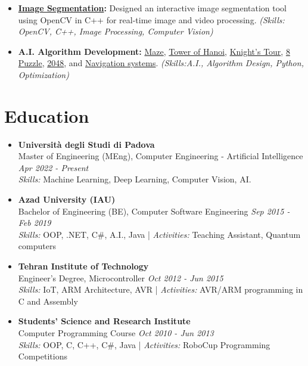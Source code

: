 \documentclass[a4paper]{article}
\begin{document}
\begin{itemize}[left=0pt]
    \item \textbf{\href{https://github.com/PooyaNasiri/image-segmenter}{Image Segmentation}:} Designed an interactive image segmentation tool using OpenCV in C++ for real-time image and video processing. \textit{(Skills: OpenCV, C++, Image Processing, Computer Vision)}

   \item \textbf{A.I. Algorithm Development:} 
\href{https://github.com/PooyaNasiri/maze}{Maze}, 
\href{https://github.com/PooyaNasiri/tower-of-hanoi}{Tower of Hanoi}, 
\href{https://github.com/PooyaNasiri/knights-tour}{Knight's Tour}, 
\href{https://github.com/PooyaNasiri/8Puzzle}{8 Puzzle}, 
\href{https://github.com/PooyaNasiri/2048}{2048}, and 
\href{https://github.com/PooyaNasiri/Navigator}{Navigation systems}. 
\textit{(Skills:A.I., Algorithm Design, Python, Optimization)}
\end{itemize}


\section*{Education}
\begin{itemize}[left=0pt]
    \item \textbf{Università degli Studi di Padova} \\
    Master of Engineering (MEng), Computer Engineering - Artificial Intelligence \hfill \textit{Apr 2022 - Present} \\
    \textit{Skills:} Machine Learning, Deep Learning, Computer Vision, AI.
    
    \item \textbf{Azad University (IAU)} \\
    Bachelor of Engineering (BE), Computer Software Engineering \hfill \textit{Sep 2015 - Feb 2019} \\
    \textit{Skills:} OOP, .NET, C\#, A.I., Java  |  \textit{Activities:} Teaching Assistant, Quantum computers

    \item \textbf{Tehran Institute of Technology} \\
    Engineer's Degree, Microcontroller \hfill \textit{Oct 2012 - Jun 2015} \\
    \textit{Skills:} IoT, ARM Architecture, AVR  | \textit{Activities:} AVR/ARM programming in C and Assembly

    \item \textbf{Students' Science and Research Institute} \\
    Computer Programming Course \hfill \textit{Oct 2010 - Jun 2013} \\
    \textit{Skills:} OOP, C, C++, C\#, Java  | \textit{Activities:} RoboCup Programming Competitions
\end{itemize}
\end{document}
